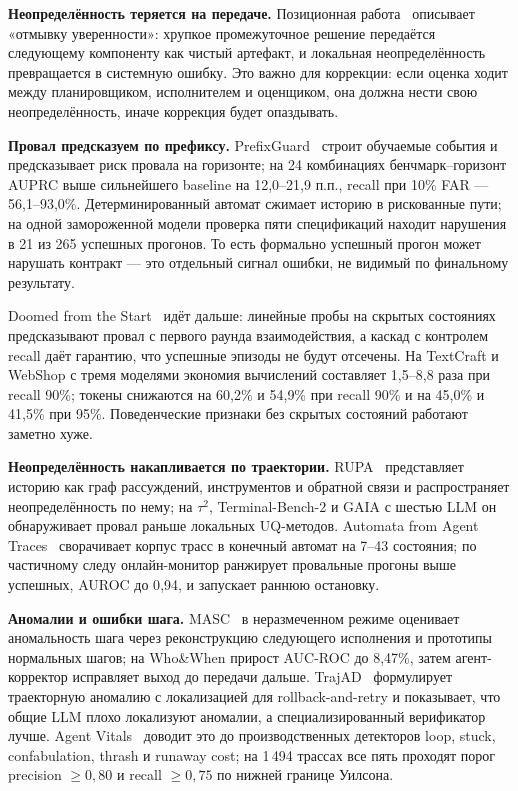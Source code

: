 \documentclass[11pt,a4paper]{article}
\begin{document}
\textbf{Неопределённость теряется на передаче.}
Позиционная работа~\cite{shi2026laundering} описывает «отмывку
уверенности»: хрупкое промежуточное решение передаётся следующему
компоненту как чистый артефакт, и локальная неопределённость превращается
в системную ошибку. Это важно для коррекции: если оценка ходит между
планировщиком, исполнителем и оценщиком, она должна нести свою
неопределённость, иначе коррекция будет опаздывать.

\textbf{Провал предсказуем по префиксу.}
PrefixGuard~\cite{huang2026prefixguard} строит обучаемые события и
предсказывает риск провала на горизонте; на 24 комбинациях
бенчмарк--горизонт AUPRC выше сильнейшего baseline на 12{,}0--21{,}9 п.п.,
recall при 10\% FAR — 56{,}1--93{,}0\%. Детерминированный автомат сжимает
историю в рискованные пути; на одной замороженной модели проверка пяти
спецификаций находит нарушения в 21 из 265 успешных прогонов. То есть
формально успешный прогон может нарушать контракт — это отдельный сигнал
ошибки, не видимый по финальному результату.

Doomed from the Start~\cite{ruan2026doomed} идёт дальше: линейные пробы на
скрытых состояниях предсказывают провал с первого раунда взаимодействия,
а каскад с контролем recall даёт гарантию, что успешные эпизоды не будут
отсечены. На TextCraft и WebShop с тремя моделями экономия вычислений
составляет 1{,}5--8{,}8 раза при recall 90\%; токены снижаются на 60{,}2\%
и 54{,}9\% при recall 90\% и на 45{,}0\% и 41{,}5\% при 95\%. Поведенческие
признаки без скрытых состояний работают заметно хуже.

\textbf{Неопределённость накапливается по траектории.}
RUPA~\cite{ma2026rupa} представляет историю как граф рассуждений,
инструментов и обратной связи и распространяет неопределённость по нему;
на $\tau^2$, Terminal-Bench-2 и GAIA с шестью LLM он обнаруживает провал
раньше локальных UQ-методов. Automata from Agent
Traces~\cite{cho2026automata} сворачивает корпус трасс в конечный автомат
на 7--43 состояния; по частичному следу онлайн-монитор ранжирует провальные
прогоны выше успешных, AUROC до 0{,}94, и запускает раннюю остановку.

\textbf{Аномалии и ошибки шага.}
MASC~\cite{shen2025masc} в неразмеченном режиме оценивает аномальность шага
через реконструкцию следующего исполнения и прототипы нормальных шагов;
на Who\&When прирост AUC-ROC до 8{,}47\%, затем агент-корректор исправляет
выход до передачи дальше. TrajAD~\cite{liu2026trajad} формулирует
траекторную аномалию с локализацией для rollback-and-retry и показывает,
что общие LLM плохо локализуют аномалии, а специализированный верификатор
лучше. Agent Vitals~\cite{niedringhaus2026vitals} доводит это до
производственных детекторов loop, stuck, confabulation, thrash и runaway
cost; на 1\,494 трассах все пять проходят порог precision $\ge 0{,}80$ и
recall $\ge 0{,}75$ по нижней границе Уилсона.
\end{document}
